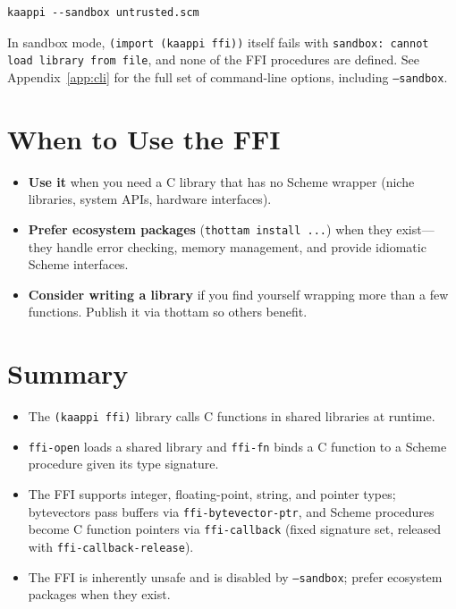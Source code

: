 \begin{lstlisting}
kaappi --sandbox untrusted.scm
\end{lstlisting}

In sandbox mode, \texttt{(import (kaappi ffi))} itself fails with \texttt{sandbox: cannot load library from file}, and none of the FFI procedures are defined. See Appendix~\ref{app:cli} for the full set of command-line options, including \texttt{--sandbox}.

\section{When to Use the FFI}

\begin{itemize}
    \item \textbf{Use it} when you need a C library that has no Scheme wrapper (niche libraries, system APIs, hardware interfaces).
    \item \textbf{Prefer ecosystem packages} (\texttt{thottam install ...}) when they exist---they handle error checking, memory management, and provide idiomatic Scheme interfaces.
    \item \textbf{Consider writing a library} if you find yourself wrapping more than a few functions. Publish it via thottam so others benefit.
\end{itemize}

\section*{Summary}

\begin{itemize}
    \item The \texttt{(kaappi ffi)} library calls C functions in shared libraries at runtime.
    \item \texttt{ffi-open} loads a shared library and \texttt{ffi-fn} binds a C function to a Scheme procedure given its type signature.
    \item The FFI supports integer, floating-point, string, and pointer types; bytevectors pass buffers via \texttt{ffi-bytevector-ptr}, and Scheme procedures become C function pointers via \texttt{ffi-callback} (fixed signature set, released with \texttt{ffi-callback-release}).
    \item The FFI is inherently unsafe and is disabled by \texttt{--sandbox}; prefer ecosystem packages when they exist.
\end{itemize}

